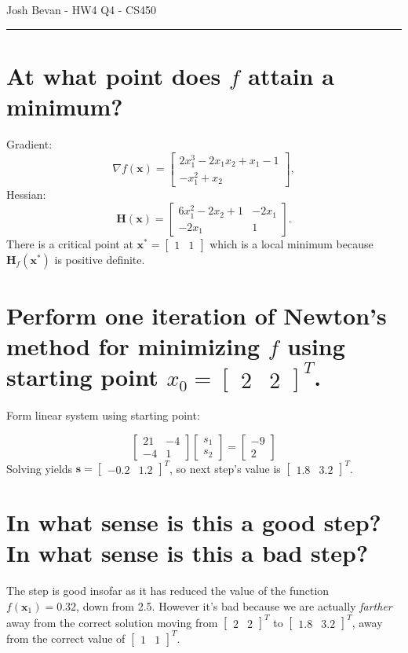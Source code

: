 \documentclass[letterpaper,10pt]{article}
\begin{document}
\begin{flushright}
{\Large Josh Bevan - HW4 Q4 - CS450}
\end{flushright}
\vskip -0.1in
\hrule
\vskip 0.3in

\section*{At what point does $f$ attain a minimum?}
Gradient:
$$\nabla f(\mathbf{x}) = \begin{bmatrix}
    2x_1^3 - 2x_1x_2 + x_1 - 1 \\
    -x_1^2 + x_2 \end{bmatrix},$$
Hessian:
$$\mathbf{H}(\mathbf{x}) = \begin{bmatrix}
    6x_1^2 - 2x_2 + 1 & -2x_1 \\
    -2x_1 & 1 \end{bmatrix}.$$
There is a critical point at $\mathbf{x^*} = \begin{bmatrix} 1 & 1 \end{bmatrix}$ which is a
local minimum because $\mathbf{H}_f(\mathbf{x^*})$ is positive definite.

\section*{Perform one iteration of Newton's method for minimizing $f$ using starting point $x_0=\begin{bmatrix} 2 & 2 \end{bmatrix}^T$.}
Form linear system using starting point:

$$\begin{bmatrix} 21 & -4 \\ -4 & 1 \end{bmatrix}
    \begin{bmatrix} s_1 \\ s_2 \end{bmatrix} =
    \begin{bmatrix} -9 \\ 2 \end{bmatrix}$$
Solving yields
$\mathbf{s} = \begin{bmatrix} -0.2 & 1.2 \end{bmatrix}^T$, so next step's value is $\begin{bmatrix} 1.8 & 3.2 \end{bmatrix}^T$.

\section*{In what sense is this a good step? In what sense is this a bad step?}
The step is good insofar as it has reduced the value of the function $f(\mathbf{x}_1) = 0.32$, down from 2.5. However it's bad because we are actually \textit{farther} away from the correct solution moving from $\begin{bmatrix} 2 & 2 \end{bmatrix}^T$ to $\begin{bmatrix} 1.8 & 3.2 \end{bmatrix}^T$, away from the correct value of $\begin{bmatrix} 1 & 1 \end{bmatrix}^T$.
 
\end{document}
